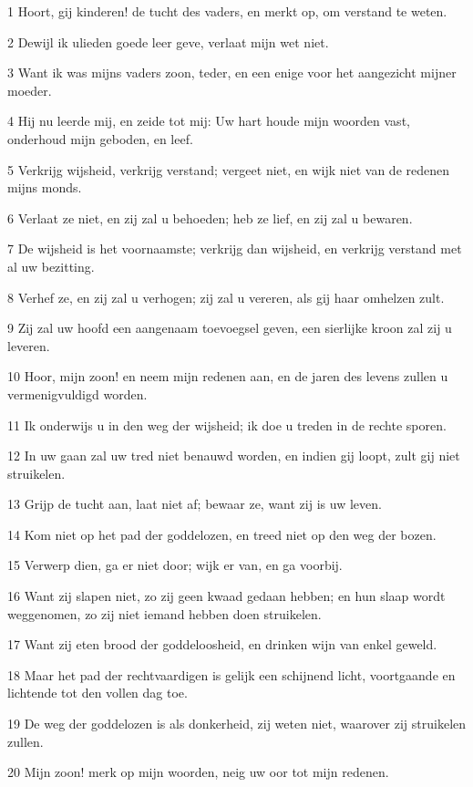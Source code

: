 \par 1 Hoort, gij kinderen! de tucht des vaders, en merkt op, om verstand te weten.
\par 2 Dewijl ik ulieden goede leer geve, verlaat mijn wet niet.
\par 3 Want ik was mijns vaders zoon, teder, en een enige voor het aangezicht mijner moeder.
\par 4 Hij nu leerde mij, en zeide tot mij: Uw hart houde mijn woorden vast, onderhoud mijn geboden, en leef.
\par 5 Verkrijg wijsheid, verkrijg verstand; vergeet niet, en wijk niet van de redenen mijns monds.
\par 6 Verlaat ze niet, en zij zal u behoeden; heb ze lief, en zij zal u bewaren.
\par 7 De wijsheid is het voornaamste; verkrijg dan wijsheid, en verkrijg verstand met al uw bezitting.
\par 8 Verhef ze, en zij zal u verhogen; zij zal u vereren, als gij haar omhelzen zult.
\par 9 Zij zal uw hoofd een aangenaam toevoegsel geven, een sierlijke kroon zal zij u leveren.
\par 10 Hoor, mijn zoon! en neem mijn redenen aan, en de jaren des levens zullen u vermenigvuldigd worden.
\par 11 Ik onderwijs u in den weg der wijsheid; ik doe u treden in de rechte sporen.
\par 12 In uw gaan zal uw tred niet benauwd worden, en indien gij loopt, zult gij niet struikelen.
\par 13 Grijp de tucht aan, laat niet af; bewaar ze, want zij is uw leven.
\par 14 Kom niet op het pad der goddelozen, en treed niet op den weg der bozen.
\par 15 Verwerp dien, ga er niet door; wijk er van, en ga voorbij.
\par 16 Want zij slapen niet, zo zij geen kwaad gedaan hebben; en hun slaap wordt weggenomen, zo zij niet iemand hebben doen struikelen.
\par 17 Want zij eten brood der goddeloosheid, en drinken wijn van enkel geweld.
\par 18 Maar het pad der rechtvaardigen is gelijk een schijnend licht, voortgaande en lichtende tot den vollen dag toe.
\par 19 De weg der goddelozen is als donkerheid, zij weten niet, waarover zij struikelen zullen.
\par 20 Mijn zoon! merk op mijn woorden, neig uw oor tot mijn redenen.

